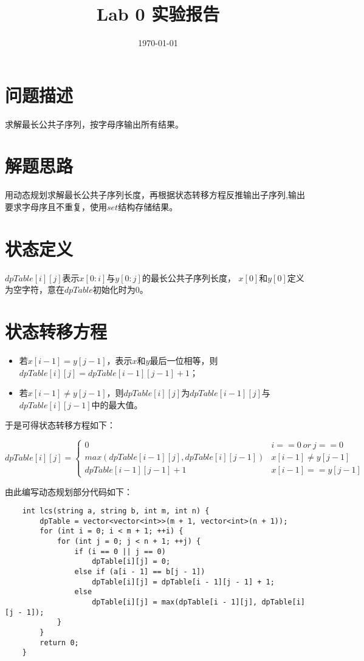 \documentclass[11pt]{article}
\begin{document}
\title{\bf Lab 0 实验报告}

\author{}
\date{\today}
\maketitle


\section{问题描述}

求解最长公共子序列，按字母序输出所有结果。


\section{解题思路}

用动态规划求解最长公共子序列长度，再根据状态转移方程反推输出子序列,输出要求字母序且不重复，使用$ set $结构存储结果。

\section{状态定义}

$ dpTable[i][j] $表示$ x[0:i] $与$ y[0:j] $的最长公共子序列长度，
$ x[0] $和$ y[0] $定义为空字符，意在$ dpTable $初始化时为0。


\section{状态转移方程}

\begin{itemize}
	\item 若$ x[i-1]=y[j-1] $，表示$ x $和$ y $最后一位相等，则$ dpTable[i][j]=dpTable[i-1][j-1]+1 $；
	\item 若$ x[i-1]\neq y[j-1] $，则$ dpTable[i][j]$为$ dpTable[i-1][j] $与$ dpTable[i][j-1] $中的最大值。
\end{itemize}

于是可得状态转移方程如下：

$$
	dpTable[i][j]=
	\begin{cases}
		0 & i==0\ or\ j==0 \\
		max(dpTable[i-1][j],dpTable[i][j-1]) & x[i-1]\neq y[j-1] \\
		dpTable[i-1][j-1]+1 & x[i-1]==y[j-1]
	\end{cases}
$$

由此编写动态规划部分代码如下：

\begin{lstlisting}
	int lcs(string a, string b, int m, int n) {
		dpTable = vector<vector<int>>(m + 1, vector<int>(n + 1));
		for (int i = 0; i < m + 1; ++i) {
			for (int j = 0; j < n + 1; ++j) {
				if (i == 0 || j == 0)
					dpTable[i][j] = 0;
				else if (a[i - 1] == b[j - 1])
					dpTable[i][j] = dpTable[i - 1][j - 1] + 1;
				else
					dpTable[i][j] = max(dpTable[i - 1][j], dpTable[i][j - 1]);
			}
		}
		return 0;
	}
\end{lstlisting}
\end{document}
